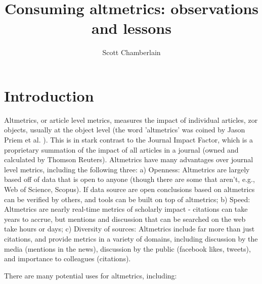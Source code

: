 \documentclass[letterpaper,superscriptaddress,showkeys,longbibliography]{revtex4-1}\usepackage{graphicx, color}
\begin{document}

\title{Consuming altmetrics: observations and lessons}

\author{Scott Chamberlain}


\maketitle

\section*{Introduction}

Altmetrics, or article level metrics, measures the impact of individual articles, zor objects, usually at the object level (the word 'altmetrics' was coined by Jason Priem et al. \cite{priem2012}). This is in stark contrast to the Journal Impact Factor, which is a proprietary summation of the impact of all articles in a journal (owned and calculated by Thomson Reuters). Altmetrics have many advantages over journal level metrics, including the following three: a) Openness: Altmetrics are largely based off of data that is open to anyone (though there are some that aren't, e.g., Web of Science, Scopus). If data source are open conclusions based on altmetrics can be verified by others, and tools can be built on top of altmetrics; b) Speed: Altmetrics are nearly real-time metrics of scholarly impact \cite{priem2012} - citations can take years to accrue, but mentions and discussion that can be searched on the web take hours or days; c) Diversity of sources: Altmetrics include far more than just citations, and provide metrics in a variety of domains, including discussion by the media (mentions in the news), discussion by the public (facebook likes, tweets), and importance to colleagues (citations).

There are many potential uses for altmetrics, including: 
\end{document}
